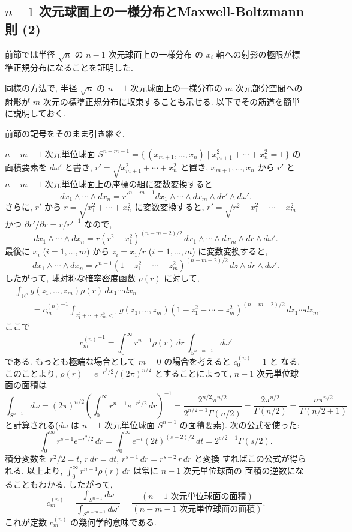 \documentclass[12pt,twoside]{jarticle}
\newcommand\R{{\mathbb R}} %
\renewcommand\d{\partial}
\theoremstyle{jplain}
\theoremstyle{jplain}
\theoremstyle{jplain}
\numberwithin{theorem}{section}
\numberwithin{equation}{section}
\numberwithin{figure}{section}
\numberwithin{table}{section}
\begin{document}

\subsection{$n-1$ 次元球面上の一様分布とMaxwell-Boltzmann則 (2)}
\label{sec:MB2}

前節では半径 $\sqrt{n}$ の $n-1$ 次元球面上の一様分布
の $x_i$ 軸への射影の極限が標準正規分布になることを証明した.

同様の方法で,
半径 $\sqrt{n}$ の $n-1$ 次元球面上の一様分布の
$m$ 次元部分空間への射影が $m$ 次元の標準正規分布に収束することも示せる.
以下でその筋道を簡単に説明しておく.

前節の記号をそのまま引き継ぐ.

$n-m-1$ 次元単位球面 $S^{n-m-1}=\{\,(x_{m+1},\ldots,x_n)\mid x_{m+1}^2+\cdots+x_n^2=1\,\}$
の面積要素を $d\omega'$ と書き,
$r'=\sqrt{x_{m+1}^2+\cdots+x_n^2}$ と置き,
$x_{m+1},\ldots,x_n$ から $r'$ と $n-m-1$ 次元単位球面上の座標の組に変数変換すると
\[
dx_1\wedge\cdots\wedge dx_n
=r'^{n-m-1}dx_1\wedge\cdots\wedge dx_m\wedge dr'\wedge d\omega'.
\]
さらに, $r'$ から $r=\sqrt{x_1^2+\cdots+x_n^2}$ に変数変換すると,
$r'=\sqrt{r^2-x_1^2-\cdots-x_m^2}$ かつ $\d r'/\d r=r/r'^{-1}$ なので,
\[
dx_1\wedge\cdots\wedge dx_n
=r(r^2-x_1^2)^{(n-m-2)/2}\,dx_1\wedge\cdots\wedge dx_m\wedge dr\wedge d\omega'.
\]
最後に $x_i$ ($i=1,\ldots,m$) から $z_i=x_1/r$ ($i=1,\ldots,m$) に変数変換すると,
\[
dx_1\wedge\cdots\wedge dx_n
=r^{n-1}(1-z_1^2-\cdots-z_m^2)^{(n-m-2)/2}\,dz\wedge dr\wedge d\omega'.
\]
したがって, 球対称な確率密度函数 $\rho(r)$ に対して,
\begin{align*}
&
\int_{\R^n} g(z_1,\ldots,z_m)\rho(r)\,dx_1\cdots dx_n
\\ & \qquad
={c^{(n)}_{m}}^{-1}
\int_{z_1^2+\cdots+z_m^2<1}
g(z_1,\ldots,z_m)(1-z_1^2-\cdots-z_m^2)^{(n-m-2)/2}\,dz_1\cdots dz_m.
\tag{$*$}
\end{align*}
ここで
\[
{c^{(n)}_m}^{-1}
=
\int_0^\infty r^{n-1}\rho(r)\,dr\,
\int_{S^{n-m-1}}d\omega'
\]
である. もっとも極端な場合として $m=0$ の場合を考えると $c^{(n)}_0=1$ と
なる. このことより, $\rho(r)=e^{-r^2/2}/(2\pi)^{n/2}$ とすることによって,
$n-1$ 次元単位球面の面積は
\[
\int_{S^{n-1}}d\omega
=(2\pi)^{n/2}\left(\int_0^\infty r^{n-1} e^{-r^2/2}\,dr \right)^{-1}
=\frac{2^{n/2}\pi^{n/2}}{2^{n/2-1}\Gamma(n/2)}
=\frac{2\pi^{n/2}}{\Gamma(n/2)}
=\frac{n\pi^{n/2}}{\Gamma(n/2+1)}
\]
と計算される($d\omega$ は $n-1$ 次元単位球面 $S^{n-1}$ の面積要素).
次の公式を使った:
\[
\int_0^\infty r^{s-1}e^{-r^2/2}\,dr
=\int_0^\infty e^{-t}(2t)^{(s-2)/2}\,dt
=2^{s/2-1}\Gamma(s/2).
\]
積分変数を $r^2/2=t$, $r\,dr=dt$, $r^{s-1}\,dr=r^{s-2}\,r\,dr$ と変換
すればこの公式が得られる.
以上より, $\int_0^\infty r^{n-1}\rho(r)\,dr$ は常に $n-1$ 次元単位球面の
面積の逆数になることもわかる. したがって,
\[
c^{(n)}_m
=\frac{\int_{S^{n-1}}d\omega}{\int_{S^{n-m-1}}d\omega'}
=\frac{(\text{$n-1$ 次元単位球面の面積})}{(\text{$n-m-1$ 次元単位球面の面積})}.
\]
これが定数 $c^{(n)}_m$ の幾何学的意味である.
\end{document}
